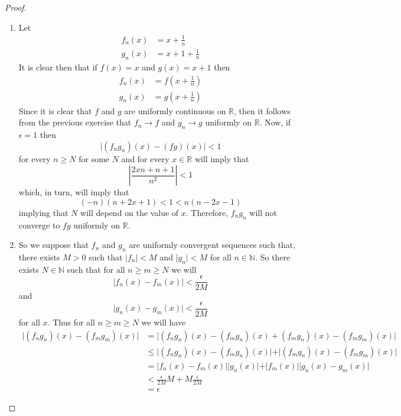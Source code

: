 \begin{enumerate}
\begin{proof}
\begin{enumerate}
        \item Let
        \begin{align*}
            f_n(x) &= x + \frac{1}{n} \\
            g_n(x) &= x+1 + \frac{1}{n}
        \end{align*}
        It is clear then that if \( f(x) = x \) and \( g(x) = x+1 \) then
        \begin{align*}
            f_n(x) &= f\left(x + \frac{1}{n}\right) \\
            g_n(x) &= g\left(x + \frac{1}{n}\right)
        \end{align*}
        Since it is clear that \( f \) and \( g \) are uniformly continuous on \( \mathbb{R} \), then it follows from the previous exercise that \( f_n \rightarrow f \) and \( g_n \rightarrow g \) uniformly on \( \mathbb{R} \). Now, if \( \epsilon = 1 \) then 
        \[
        \vert (f_ng_n)(x) - (fg)(x) \vert < 1 
        \]
        for every \( n \geq N \) for some \( N \) and for every \( x \in \mathbb{R} \) will imply that
        \[
        \left| \frac{2xn + n + 1}{n^2} \right| < 1 
        \]
        which, in turn, will imply that
        \[
        (-n)(n+2x+1) < 1 < n(n-2x-1)
        \]
        implying that \( N \) will depend on the value of \( x \). Therefore, \( f_ng_n \) will not converge to \( fg \) uniformly on \( \mathbb{R} \).
        
        \item So we suppose that \( f_n \) and \( g_n \) are uniformly convergent sequences such that, there exists \( M > 0 \) such that \( \vert f_n \vert < M \) and \( \vert g_n \vert < M \) for all \( n \in \mathbb{N} \). So there exists \( N \in \mathbb{N} \) such that for all \( n \geq m \geq N \) we will 
        \[
        \vert f_n(x) - f_m(x) \vert < \frac{\epsilon}{2M} 
        \]
        and 
        \[
        \vert g_n(x) - g_m(x) \vert < \frac{\epsilon}{2M}
        \]
        for all \( x \). Thus for all \( n \geq m \geq N \) we will have
        \begin{align*}
            \vert (f_ng_n)(x) - (f_mg_m)(x) \vert &= \vert (f_ng_n)(x) - (f_mg_n)(x) + (f_mg_n)(x) - (f_mg_m)(x) \vert \\
            &\leq \vert (f_ng_n)(x) - (f_mg_n)(x) \vert + \vert (f_mg_n)(x) - (f_mg_m)(x) \vert \\
            &= \vert f_n(x) - f_m(x) \vert \vert g_n(x) \vert + \vert f_m(x) \vert  \vert g_n(x) - g_m(x) \vert \\
            &< \frac{\epsilon}{2M}M + M \frac{\epsilon}{2M} \\
            &= \epsilon 
        \end{align*}
    \end{enumerate}
    \end{proof}
    
    
    
\end{enumerate}